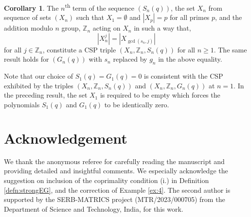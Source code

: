 \documentclass{article}
\numberwithin{equation}{section}
\theoremstyle{definition}
\newtheorem{corollary}[definition]{\bf {Corollary}}
\begin{document}
\begin{corollary}
    The $n$\textsuperscript{th} term of the sequence $(S_n(q))$, the set $X_n$ from sequence of sets $(X_n)$ such that $X_1=\emptyset$ and $|X_p|=p$ for all primes $p$, and the addition modulo $n$ group,  $\mathbb{Z}_n$ acting on $X_n$ in such a way that, 
    \[|X_n^j|=|X_{\gcd(s_n,j)}|\] for all $j\in\mathbb{Z}_n$, constitute a CSP triple $(X_n,\mathbb{Z}_n,S_n(q))$ for all $n\geq1$. The same result holds for $(G_n(q))$ with $s_n$ replaced by $g_n$ in the above equality.
\end{corollary}
Note that our choice of $S_1(q)=G_1(q)=0$ is consistent with the CSP exhibited by the triples $(X_n,\mathbb{Z}_n,S_n(q))$ and $(X_n,\mathbb{Z}_n,G_n(q))$ at $n=1$. In the preceding result, the set $X_1$ is required to be empty which forces the polynomials $S_1(q)$ and $G_1(q)$ to be identically zero. 

\section*{Acknowledgement} 
We thank the anonymous referee for carefully reading the manuscript and providing detailed and insightful comments. We especially acknowledge the suggestion on inclusion of the coprimality condition (i.) in Definition \ref{defn:strongEG}, and the correction of Example \ref{ex:4}. The second author is supported by the SERB-MATRICS project (MTR/2023/000705) from the Department of Science and Technology, India, for this work.



\end{document}
